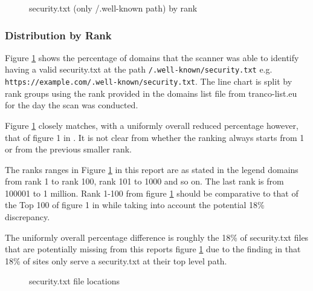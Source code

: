 \documentclass{mscreport}
\begin{document}
\begin{figure}[t]
	\begin{center}
		\caption{security.txt (only /.well-known path) by rank}
		\label{fig:security_txt_by_rank}
	\end{center}
\end{figure}

\subsubsection{Distribution by Rank}

\noindent
Figure \ref{fig:security_txt_by_rank} shows the percentage of domains that the scanner was able to identify having a valid security.txt at the path \texttt{/.well-known/security.txt} e.g. \newline \texttt{https://example.com/.well-known/security.txt}. The line chart is split by rank groups using the rank provided in the domains list file from tranco-list.eu for the day the scan was conducted.

\vspace{0.3cm} \noindent
Figure \ref{fig:security_txt_by_rank} closely matches, with a uniformly overall reduced percentage however, that of figure 1 in \cite{Poteat2021-zr}. It is not clear from \cite{Poteat2021-zr} whether the ranking always starts from 1 or from the previous smaller rank.

\vspace{0.3cm} \noindent
The ranks ranges in Figure \ref{fig:security_txt_by_rank} in this report are as stated in the legend domains from rank 1 to rank 100, rank 101 to 1000 and so on. The last rank is from 100001 to 1 million. Rank 1-100 from figure \ref{fig:security_txt_by_rank} should be comparative to that of the Top 100 of figure 1 in \cite{Poteat2021-zr} while taking into account the potential 18\% discrepancy.

\vspace{0.3cm} \noindent
The uniformly overall percentage difference is roughly the 18\% of security.txt files that are potentially missing from this reports figure \ref{fig:security_txt_by_rank} due to the finding in \cite{Poteat2021-zr} that 18\% of sites only serve a security.txt at their top level path.

\begin{figure}[t]
	\begin{center}
		\caption{security.txt file locations}
		\label{fig:security_txt_by_root_vs_non_root}
	\end{center}
\end{figure}
\end{document}
